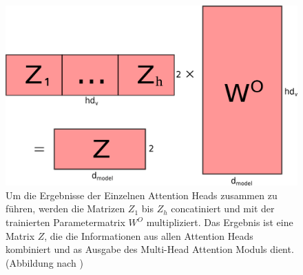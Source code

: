 \documentclass[conference]{IEEEtran}
\begin{document}
\begin{figure}[htbp]
\includegraphics[width=\linewidth]{img/vis4.png}
\caption{Um die Ergebnisse der Einzelnen Attention Heads zusammen zu führen, werden die Matrizen $Z_1$ bis $Z_h$ concatiniert und mit der trainierten Parametermatrix $W^O$ multipliziert. Das Ergebnis ist eine Matrix $Z$, die die Informationen aus allen Attention Heads kombiniert und as Ausgabe des Multi-Head Attention Moduls dient. (Abbildung nach \cite{illustrated_transformer})}
\label{vis:4}
\end{figure}
\end{document}
